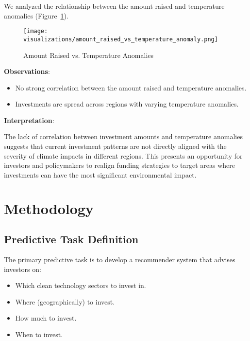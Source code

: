 \documentclass[sigconf]{acmart}
\begin{document}
We analyzed the relationship between the amount raised and temperature anomalies (Figure~\ref{fig:amount_vs_temp}).

\begin{figure}[htpb]
    \centering
    \texttt{[image: visualizations/amount\_raised\_vs\_temperature\_anomaly.png]}
    \caption{Amount Raised vs. Temperature Anomalies}
    \label{fig:amount_vs_temp}
\end{figure}

\textbf{Observations}:

\begin{itemize}
    \item No strong correlation between the amount raised and temperature anomalies.
    \item Investments are spread across regions with varying temperature anomalies.
\end{itemize}

\textbf{Interpretation}:

The lack of correlation between investment amounts and temperature anomalies suggests that current investment patterns are not directly aligned with the severity of climate impacts in different regions. This presents an opportunity for investors and policymakers to realign funding strategies to target areas where investments can have the most significant environmental impact.

\section{Methodology}

\subsection{Predictive Task Definition}

The primary predictive task is to develop a recommender system that advises investors on:

\begin{itemize}
    \item Which clean technology sectors to invest in.
    \item Where (geographically) to invest.
    \item How much to invest.
    \item When to invest.
\end{itemize}
\end{document}
